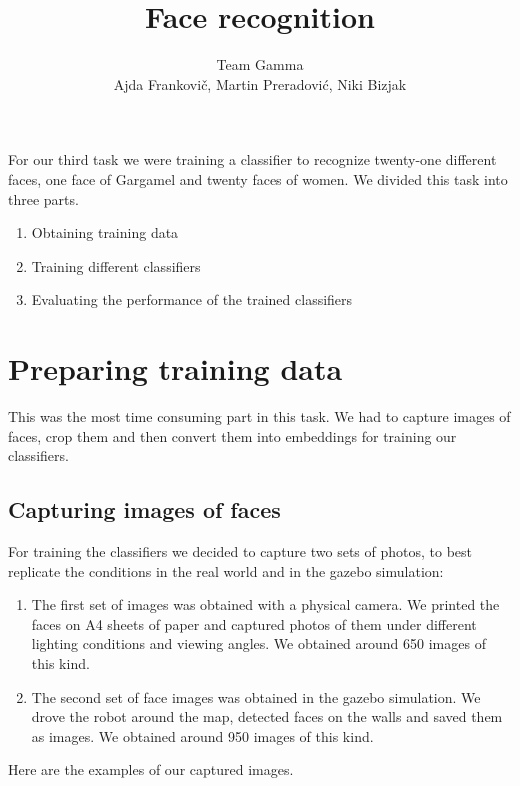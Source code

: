 \documentclass[12pt,a4paper]{article}
\author{Team Gamma \\ {\small Ajda Frankovič, Martin Preradović, Niki Bizjak}}
\title{Face recognition}
\date{}
\begin{document}
    \maketitle

    For our third task we were training a classifier to recognize twenty-one different faces, one face of Gargamel and twenty faces of women. We divided this task into three parts.

    \begin{enumerate}
      \item Obtaining training data
      \item Training different classifiers
      \item Evaluating the performance of the trained classifiers
    \end{enumerate}

    \section{Preparing training data}

    This was the most time consuming part in this task. We had to capture images of faces, crop them and then convert them into embeddings for training our classifiers.

    \subsection{Capturing images of faces}

    For training the classifiers we decided to capture two sets of photos, to best replicate the conditions in the real world and in the gazebo simulation:

    \begin{enumerate}
      \item The first set of images was obtained with a physical camera. We printed the faces on A4 sheets of paper and captured photos of them under different lighting conditions and viewing angles. We obtained around 650 images of this kind.
      \item The second set of face images was obtained in the gazebo simulation. We drove the robot around the map, detected faces on the walls and saved them as images. We obtained around 950 images of this kind.
    \end{enumerate}    

    Here are the examples of our captured images.
\end{document}
